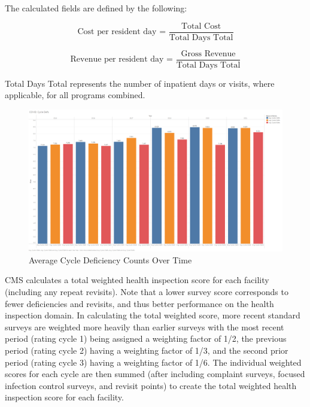 \documentclass{article}
\theoremstyle{mytheoremstyle}
\theoremstyle{mytheoremstyle}
\theoremstyle{myproblemstyle}
\begin{document}
\noindent The calculated fields are defined by the following:

\[\text{Cost per resident day = }\frac{\text{Total Cost}}{\text{Total Days Total}}\]

\[\text{Revenue per resident day = }\frac{\text{Gross Revenue}}{\text{Total Days Total}}\]

\noindent Total Days Total represents the number of inpatient days or visits, where applicable, for all programs combined.

\pagebreak
\begin{figure}[htbp]
\centering
\includegraphics[width=\linewidth]{Images/COVID Cycle Defs.png}
\caption{Average Cycle Deficiency Counts Over Time}
\label{defs over time}
\end{figure}

CMS calculates a total weighted health inspection score for each facility (including any repeat revisits). 
Note that a lower survey score corresponds to fewer deficiencies and revisits, and thus better performance 
on the health inspection domain. In calculating the total weighted score, more recent standard surveys are 
weighted more heavily than earlier surveys with the most recent period (rating cycle 1) being assigned a 
weighting factor of 1/2, the previous period (rating cycle 2) having a weighting factor of 1/3, and the 
second prior period (rating cycle 3) having a weighting factor of 1/6. The individual weighted scores for 
each cycle are then summed (after including complaint surveys, focused infection control surveys, and 
revisit points) to create the total weighted health inspection score for each facility. 
\end{document}
